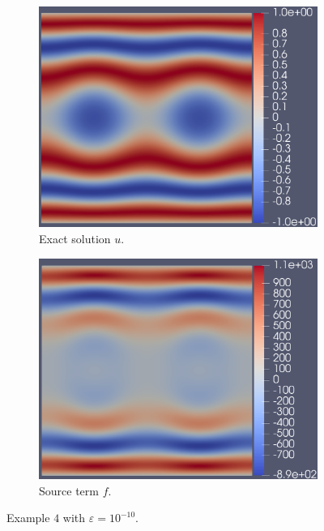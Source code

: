 \documentclass[12pt]{ociamthesis}
\begin{document}
\begin{figure}[H]
 \begin{subfigure}{0.5\textwidth}
     \includegraphics[width=\textwidth]{Pics/uf/U_E4_eps_10.png}
     \caption{Exact solution $u$.}
 \end{subfigure}
   \begin{subfigure}{0.5\textwidth}
     \includegraphics[width=\textwidth]{Pics/uf/F_E4_eps_10.png}
     \caption{Source term $f$.}
 \end{subfigure}
 \caption{Example $4$ with $\varepsilon = 10^{-10}$.} \label{E4_uf}
\end{figure}
\end{document}

